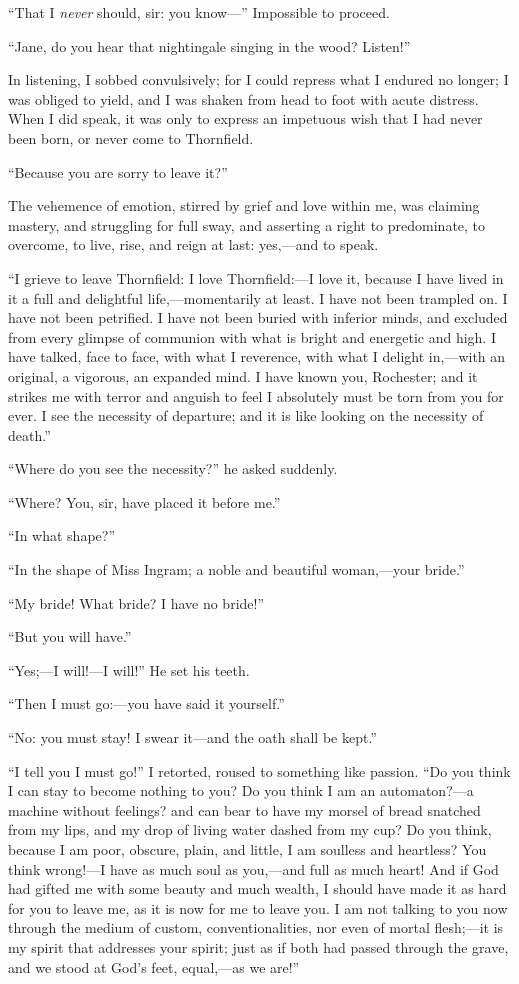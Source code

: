\enquote{That I \emph{never} should, sir: you know---} Impossible to proceed.

\enquote{Jane, do you hear that nightingale singing in the wood? 
Listen!}

In listening, I sobbed convulsively; for I could repress what I endured
no longer; I was obliged to yield, and I was shaken from head to foot
with acute distress. When I did speak, it was only to express an
impetuous wish that I had never been born, or never come to Thornfield.

\enquote{Because you are sorry to leave it?}

The vehemence of emotion, stirred by grief and love within me, was
claiming mastery, and struggling for full sway, and asserting a right to
predominate, to overcome, to live, rise, and reign at last: yes,---and
to speak.

\enquote{I grieve to leave Thornfield: I love Thornfield:---I love it,
because I have lived in it a full and delightful life,---momentarily at
least. I have not been trampled on. I have not been petrified. I have
not been buried with inferior minds, and excluded from every glimpse of
communion with what is bright and energetic and high. I have talked,
face to face, with what I reverence, with what I delight in,---with an
original, a vigorous, an expanded mind. I have known you, \Mr{}
 Rochester; and it strikes me with terror and anguish to feel I
absolutely must be torn from you for ever. I see the necessity of
departure; and it is like looking on the necessity of death.}

\enquote{Where do you see the necessity?} he asked suddenly.

\enquote{Where? You, sir, have placed it before me.}

\enquote{In what shape?}

\enquote{In the shape of Miss Ingram; a noble and beautiful
woman,---your bride.}

\enquote{My bride! What bride? I have no bride!}

\enquote{But you will have.}

\enquote{Yes;---I will!---I will!} He set his teeth.

\enquote{Then I must go:---you have said it yourself.}

\enquote{No: you must stay! I swear it---and the oath shall be kept.}

\enquote{I tell you I must go!} I retorted, roused to something like
passion. \enquote{Do you think I can stay to become nothing to you? Do
you think I am an automaton?---a machine without feelings? and can bear
to have my morsel of bread snatched from my lips, and my drop of living
water dashed from my cup? Do you think, because I am poor, obscure,
plain, and little, I am soulless and heartless? You think wrong!---I
have as much soul as you,---and full as much heart! And if God had
gifted me with some beauty and much wealth, I should have made it as
hard for you to leave me, as it is now for me to leave you. I am not
talking to you now through the medium of custom, conventionalities, nor
even of mortal flesh;---it is my spirit that addresses your spirit; just
as if both had passed through the grave, and we stood at God's feet,
equal,---as we are!}

